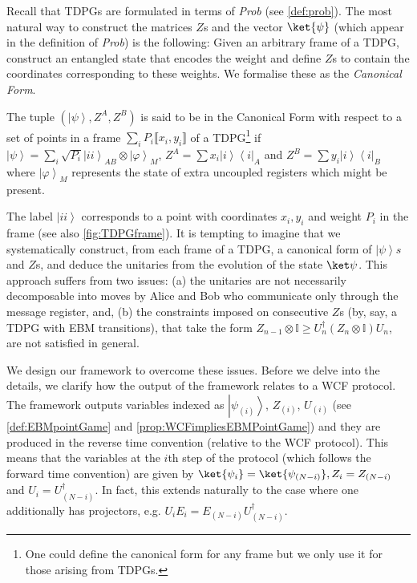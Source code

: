 \documentclass{article}
\newcommand{\atul}[1]{#1} %
\begin{document}
Recall that TDPGs are formulated in terms of \emph{Prob} (see \cref{def:prob}). The most natural way to construct the matrices $Z$s and the vector $\ket{\psi}$ (which appear in the definition of \emph{Prob}) is the following: Given an arbitrary frame of a TDPG, construct an entangled state that encodes the weight and define $Z$s to contain the coordinates corresponding to these weights. %
We formalise these as the \emph{Canonical Form}.
%

%
%
%
%
%

\begin{definition}
  The tuple $(\left|\psi\right\rangle ,Z^{A},Z^{B})$ is said to be
  in the Canonical Form with respect to a set of points in a frame \atul{$\sum_i P_i \llbracket x_i,y_i \rrbracket$} of
  a TDPG\footnote{One could define the canonical form for any frame but we only use it for those arising from TDPGs.} if  $\left|\psi\right\rangle =\sum_{i}\sqrt{P_{i}}\left|ii\right\rangle _{AB}\otimes\left|\varphi\right\rangle _{M}$,
  $Z^{A}=\sum x_{i}\left|i\right\rangle \left\langle i\right|_{A}$
  and $Z^{B}=\sum y_{i}\left|i\right\rangle \left\langle i\right|_{B}$
  where $\left|\varphi\right\rangle _{M}$ represents the state of extra
  uncoupled registers which might be present.\label{def:canonicalform}
\end{definition}

The label $\left|ii\right\rangle$
corresponds to a point with coordinates $x_{i},y_{i}$ and weight $P_{i}$
in the frame (see also  \cref{fig:TDPGframe}). It is tempting to imagine that
we systematically construct, from each frame of a TDPG, a canonical
form of $\left|\psi\right\rangle s$ and $Z$s, and deduce the unitaries from the evolution of the state $\ket \psi$. This approach suffers from two issues: (a) the unitaries are not necessarily decomposable into moves by Alice and Bob who communicate only through the message register, and, (b) the constraints imposed on consecutive $Z$s (by, say, a TDPG with EBM transitions), that take the form $Z_{n-1}\otimes\mathbb{I}\ge U_{n}^{\dagger}\left(Z_{n}\otimes\mathbb{I}\right)U_{n}$, are not satisfied in general.

We design our framework to overcome these issues. Before we delve into the details, we clarify how the output of the framework relates to a WCF protocol. The framework outputs variables indexed as $\left|\psi_{(i)}\right\rangle $, $Z_{(i)}$,
$U_{(i)}$ (see \cref{def:EBMpointGame} and \cref{prop:WCFimpliesEBMPointGame}) and they are produced in the reverse time convention (relative to the WCF protocol). This means that the variables at the $i$th step of the protocol (which follows the forward time convention) are given by $\ket{\psi_{i}}=\ket{\psi_{(N-i)}}, Z_i=Z_{(N-i)}$ and $U_{i}=U^\dagger_{(N-i)}$. In fact, this extends naturally to the case where one additionally has projectors, e.g. $U_{i}E_{i}=E_{(N-i)}U_{(N-i)}^{\dagger}$.
\end{document}
